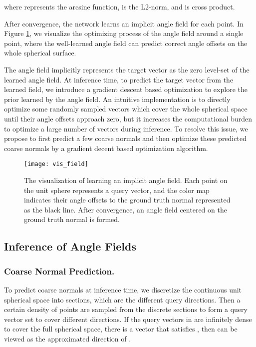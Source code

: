 \documentclass[letterpaper]{article} \usepackage{aaai23}  \usepackage{times}  \usepackage{helvet}  \usepackage{courier}  \usepackage[hyphens]{url}  \usepackage{graphicx} \urlstyle{rm} \def\UrlFont{\rm}  \usepackage{natbib}  \usepackage{caption} \frenchspacing  \setlength{\pdfpagewidth}{8.5in} \setlength{\pdfpageheight}{11in} \usepackage{algorithm}
\begin{document}
where  represents the arcsine function,  is the L2-norm, and  is cross product.

After convergence, the network learns an implicit angle field for each point. In Figure \ref{fig:field visualization}, we visualize the optimizing process of the angle field around a single point, where the well-learned angle field can predict correct angle offsets on the whole spherical surface. 

The angle field implicitly represents the target vector as the zero level-set of the learned angle field. At inference time, to predict the target vector from the learned field, we introduce a gradient descent based optimization to explore the prior learned by the angle field. An intuitive implementation is to directly optimize some randomly sampled vectors which cover the whole spherical space until their angle offsets approach zero, but it increases the computational burden to optimize a large number of vectors during inference. To resolve this issue, we propose to first predict a few coarse normals and then optimize these predicted coarse normals by a gradient decent based optimization algorithm. 

\begin{figure}[t]
\centering
\texttt{[image: vis\_field]}
\caption{The visualization of learning an implicit angle field. Each point on the unit sphere represents a query vector, and the color map indicates their angle offsets to the ground truth normal represented as the black line. After convergence, an angle field centered on the ground truth normal is formed.}
\label{fig:field visualization}
\end{figure}

\subsection{Inference of Angle Fields}


\subsubsection{Coarse Normal Prediction.}
To predict coarse normals at inference time, we discretize the continuous unit spherical space into sections, which are the different query directions. Then a certain density of points are sampled from the discrete sections to form a query vector set  to cover  different directions. 
If the query vectors in  are infinitely dense to cover the full spherical space, there is a vector  that satisfies , then  can be viewed as the approximated direction of  .
\end{document}
